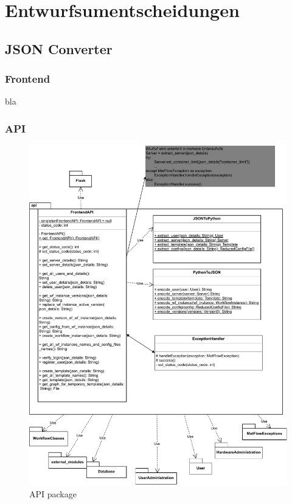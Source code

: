 \section{Entwurfsumentscheidungen}

\subsection{JSON Converter}
    \subsubsection{Frontend}
    bla
    \subsubsection{API} \label{json_backend}
        \begin{figure}[H]
            \label{API}
            \centerline{\includegraphics[scale=0.5]{res/api.drawio.pdf}}
            \caption{API package}
        \end{figure}
